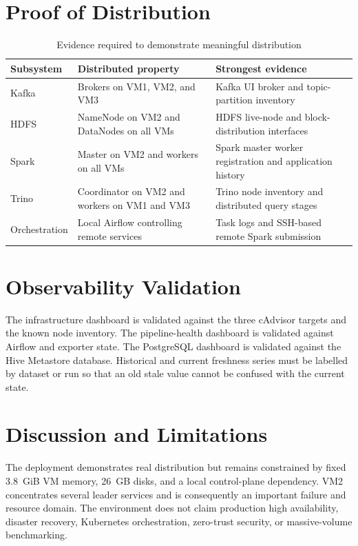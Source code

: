 \section{Proof of Distribution}
\begin{table}[htbp]
    \centering
    \small
    \begin{tabularx}{\textwidth}{|>{\RaggedRight\arraybackslash}p{}|>{\RaggedRight\arraybackslash}p{}|>{\RaggedRight\arraybackslash}X|}
        \hline
        \rowcolor{ModernTableHeader}
        \color{white}\textbf{Subsystem} & \color{white}\textbf{Distributed property} & \color{white}\textbf{Strongest evidence} \\
        \hline
        Kafka & Brokers on VM1, VM2, and VM3 & Kafka UI broker and topic-partition inventory \\
        \hline
        HDFS & NameNode on VM2 and DataNodes on all VMs & HDFS live-node and block-distribution interfaces \\
        \hline
        Spark & Master on VM2 and workers on all VMs & Spark master worker registration and application history \\
        \hline
        Trino & Coordinator on VM2 and workers on VM1 and VM3 & Trino node inventory and distributed query stages \\
        \hline
        Orchestration & Local Airflow controlling remote services & Task logs and SSH-based remote Spark submission \\
        \hline
    \end{tabularx}
    \caption{Evidence required to demonstrate meaningful distribution}
    \label{tab:evaluation-distributed-proof}
\end{table}

\section{Observability Validation}
The infrastructure dashboard is validated against the three cAdvisor targets and the known node inventory. The pipeline-health dashboard is validated against Airflow and exporter state. The PostgreSQL dashboard is validated against the Hive Metastore database. Historical and current freshness series must be labelled by dataset or run so that an old stale value cannot be confused with the current state.

\section{Discussion and Limitations}
The deployment demonstrates real distribution but remains constrained by fixed 3.8~GiB VM memory, 26~GB disks, and a local control-plane dependency. VM2 concentrates several leader services and is consequently an important failure and resource domain. The environment does not claim production high availability, disaster recovery, Kubernetes orchestration, zero-trust security, or massive-volume benchmarking.

